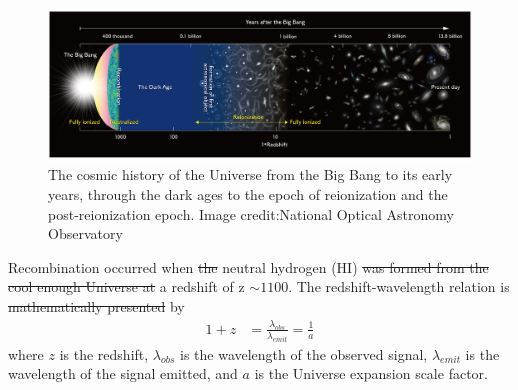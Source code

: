 	\begin{figure}
		\begin{center}
			\includegraphics[width=\linewidth]{Figures/Reionizationtimeline.jpg}
			\caption{The cosmic history of the Universe from the Big Bang to its early years, through the dark ages to the epoch of reionization and the post-reionization epoch. Image credit:National Optical Astronomy Observatory}
			\label{Fig:timeline}
		\end{center}
	\end{figure}
        
	Recombination occurred when  \st{the} neutral hydrogen (HI)  \st{was formed from the cool enough Universe at} a redshift of z $\sim1100$.  The redshift-wavelength relation is \st{mathematically presented}  by
	\begin{equation}
	\begin{split}
	1+z & = \frac{\lambda_{obs}}{\lambda_{emit}}= \frac{1}{a}
	\end{split}
	\end{equation}
	where $z$ is the redshift, $\lambda_{obs}$ is the wavelength of the observed signal, $\lambda_{emit}$ is the wavelength of the signal emitted, and $a$ is the Universe expansion scale factor. 
	
